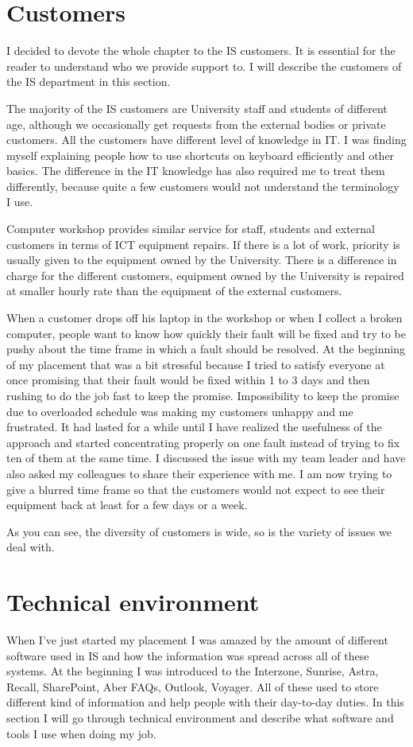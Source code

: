 \documentclass[10pt,a4paper,headinclude=true]{report}
\begin{document}
\chapter{Customers}
I decided to devote the whole chapter to the IS customers. It is essential for the reader to understand who we provide support to. I will describe the customers of the IS department in this section.

The majority of the IS customers are University staff and students of different age, although we occasionally get requests from the external bodies or private customers. All the customers have different level of knowledge in IT. I was finding myself explaining people how to use shortcuts on keyboard efficiently and other basics. The difference in the IT knowledge has also required me to treat them differently, because quite a few customers would not understand the terminology I use.  

Computer workshop provides similar service for staff, students and external customers in terms of ICT equipment repairs. If there is a lot of work, priority is usually given to the equipment owned by the University. There is a difference in charge for the different customers, equipment owned by the University is repaired at smaller hourly rate than the equipment of the external customers.

When a customer drops off his laptop in the workshop or when I collect a broken computer, people want to know how quickly their fault will be fixed and try to be pushy about the time frame in which a fault should be resolved. At the beginning of my placement that was a bit stressful because I tried to satisfy everyone at once promising that their fault would be fixed within 1 to 3 days and then rushing to do the job fast to keep the promise. Impossibility to keep the promise due to overloaded schedule was making my customers unhappy and me frustrated. It had lasted for a while until I have realized the usefulness of the approach and started concentrating properly on one fault instead of trying to fix ten of them at the same time. I discussed the issue with my team leader and have also asked my colleagues to share their experience with me. I am now trying to give a blurred time frame so that the customers would not expect to see their equipment back at least for a few days or a week. 

As you can see, the diversity of customers is wide, so is the variety of issues we deal with.

\chapter{Technical environment}
When I've just started my placement I was amazed by the amount of different software used in IS and how the information was spread across all of these systems. At the beginning I was introduced to the Interzone, Sunrise, Astra, Recall, SharePoint, Aber FAQs, Outlook, Voyager. All of these used to store different kind of information and help people with their day-to-day duties. In this section I will go through technical environment and describe what software and tools I use when doing my job.
  
\end{document}
